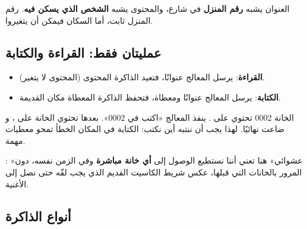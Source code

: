 \begin{tashbih}
    العنوان يشبه \textbf{رقم المنزل} في شارع، والمحتوى يشبه \textbf{الشخص الذي يسكن فيه}.
    رقم المنزل ثابت، أما السكان فيمكن أن يتغيروا.
\end{tashbih}

\subsection{عمليتان فقط: القراءة والكتابة}
\begin{itemize}
    \item \textbf{القراءة}: يرسل المعالج عنوانًا، فتعيد الذاكرة المحتوى (المحتوى لا يتغير).
    \item \textbf{الكتابة}: يرسل المعالج عنوانًا ومعطاة، فتحفظ الذاكرة المعطاة مكان القديمة.
\end{itemize}

\begin{mithal}
    الخانة \textenglish{0002} تحتوي على . ينفذ المعالج «اكتب  في \textenglish{0002}».
    بعدها تحتوي الخانة على ، و ضاعت نهائيًا. لهذا يجب أن ننتبه أين نكتب: الكتابة
    في المكان الخطأ تمحو معطيات مهمة.
\end{mithal}

\begin{tarif}
    : «عشوائي» هنا تعني
    أننا نستطيع الوصول إلى \textbf{أي خانة مباشرة} وفي الزمن نفسه، دون المرور بالخانات التي قبلها، عكس
    شريط الكاسيت القديم الذي يجب لفّه حتى نصل إلى الأغنية.
\end{tarif}

\subsection{أنواع الذاكرة}
\begin{center}
\end{center}

